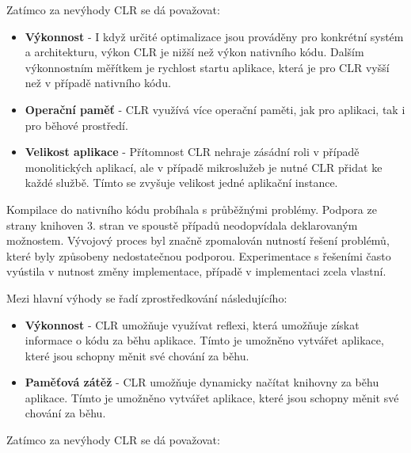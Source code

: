 
Zatímco za nevýhody CLR se dá považovat:

\begin{itemize}
    \item  \textbf{Výkonnost} - I když určité optimalizace jsou prováděny pro konkrétní systém a architekturu, výkon CLR je nižší než výkon nativního kódu. Dalším výkonnostním měřítkem je rychlost startu aplikace, která je pro CLR vyšší než v případě nativního kódu.
    \item \textbf{Operační paměť} - CLR využívá více operační paměti, jak pro aplikaci, tak i pro běhové prostředí.
    \item \textbf{Velikost aplikace} - Přítomnost CLR nehraje zásádní roli v případě monolitických aplikací, ale v případě mikroslužeb je nutné CLR přidat ke každé službě. Tímto se zvyšuje velikost jedné aplikační instance.
\end{itemize}


Kompilace do nativního kódu probíhala s průběžnými problémy. Podpora ze strany knihoven 3. stran ve spoustě případů neodopvídala deklarovaným možnostem. Vývojový proces byl značně zpomalován nutností řešení problémů, které byly způsobeny nedostatečnou podporou. Experimentace s řešeními často vyústila v nutnost změny implementace, případě v implementaci zcela vlastní.


Mezi hlavní výhody se řadí zprostředkování následujícího:

\begin{itemize}
    \item  \textbf{Výkonnost} - CLR umožňuje využívat reflexi, která umožňuje získat informace o kódu za běhu aplikace. Tímto je umožněno vytvářet aplikace, které jsou schopny měnit své chování za běhu.
    \item \textbf{Paměťová zátěž} - CLR umožňuje dynamicky načítat knihovny za běhu aplikace. Tímto je umožněno vytvářet aplikace, které jsou schopny měnit své chování za běhu.
\end{itemize}


Zatímco za nevýhody CLR se dá považovat:

